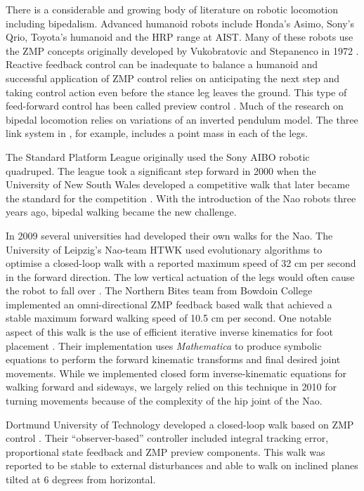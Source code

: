\documentclass[pdftex,11pt,a4paper]{report}
\begin{document}
There is a considerable and growing body of literature on robotic  locomotion including bipedalism. Advanced humanoid robots include Honda's Asimo, Sony's Qrio, Toyota's humanoid and the HRP range at AIST. Many of these robots use the ZMP concepts originally developed by Vukobratovic and Stepanenco in 1972 \cite{DBLP:journals/ijhr/VukobratovicB04}. Reactive feedback control can be inadequate to balance a humanoid and successful application of ZMP control relies on anticipating the next step and taking control action even before the stance leg leaves the ground. This type of feed-forward control has been called preview control \cite{Kajita03bipedwalking}. Much of the research on bipedal locomotion relies on variations of an inverted pendulum model. The three link system in \cite{feng08biped}, for example, includes a point mass in each of the legs. 

The Standard Platform League originally used the Sony AIBO robotic quadruped. The league took a significant step forward in 2000 when the University of New South Wales developed a competitive walk that later became the standard for the competition \cite{DBLP:conf/robocup/HengstIPS01}. With the introduction of the Nao robots three years ago, bipedal walking became the new challenge.  

In 2009 several universities had developed their own walks for the Nao. The University of Leipzig's Nao-team HTWK used evolutionary algorithms to optimise a closed-loop walk with a reported maximum speed of 32 cm per second in the forward direction. The low vertical actuation of the legs would often cause the robot to fall over \cite{htwk09teamreport}. The Northern Bites team from Bowdoin College implemented an omni-directional ZMP feedback based walk that achieved a stable maximum forward walking speed of 10.5 cm per second. One notable aspect of this walk is the use of efficient iterative inverse kinematics for foot placement \cite{DBLP:conf/robocup/StromSC09}. Their implementation uses \emph{Mathematica} to produce symbolic equations to perform the forward kinematic transforms and final desired joint movements. While we implemented closed form inverse-kinematic equations for walking forward and sideways, we largely relied on this technique in 2010 for turning movements because of the complexity of the hip joint of the Nao. 

Dortmund University of Technology developed a closed-loop walk based on ZMP control \cite{Czarnetzki10applying}. Their ``observer-based'' controller included integral tracking error, proportional state feedback and ZMP preview components. This walk was reported to be stable to external disturbances and able to walk on inclined planes tilted at 6 degrees from horizontal. 
\end{document}
